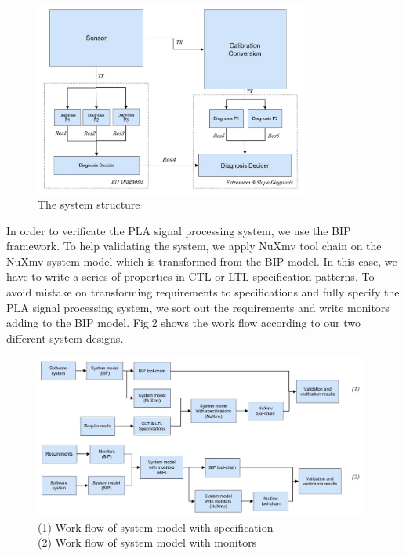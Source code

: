 \begin{figure}[ht!]
	\centering
	\includegraphics[width=90mm]{figure/sys_structure.jpg}
	\caption{The system structure}
	\label{sys_structure}
\end{figure}

In order to verificate the PLA signal processing system, we use the BIP framework. To help validating the system, we apply NuXmv tool chain on the NuXmv system model which is transformed from the BIP model. In this case, we have to write a series of properties in CTL or LTL specification patterns. To avoid mistake on transforming requirements to specifications and fully specify the PLA signal processing system, we sort out the requirements and write monitors adding to the BIP model. Fig.2 shows the work flow according to our two different system designs.

\begin{figure}[ht!]
	\centering
	\includegraphics[width=110mm]{figure/work_flow.jpg}
	\caption{(1) Work flow of system model with specification 
		     \protect\\(2) Work flow of system model with monitors}
	\label{work_flow}
\end{figure}

